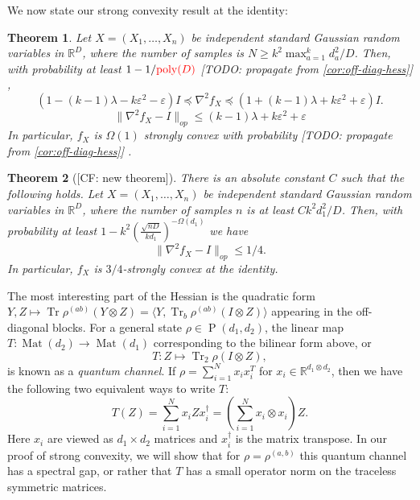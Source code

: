 \documentclass{article}
\newtheorem{theorem}{Theorem}
\DeclareMathOperator{\poly}{poly}
\DeclarePairedDelimiter{\norm}{\lVert}{\rVert}
\newcommand{\R}{{\mathbb{R}}}
\newcommand{\ot}{\otimes}
\newcommand{\mat}{\operatorname{Mat}}
\newcommand\eps{\varepsilon}
\newcommand\PD{\operatorname{P}}
\newcommand\samp{x}
\newcommand\rv{X}
\newcommand\tr{\operatorname{Tr}}
\newcommand{\CF}[1]{{\color{purple}[CF: #1]}}
\newcommand{\MW}[1]{{\color{red}[MW: #1]}}
\newcommand{\TODO}[1]{{\color{blue}[TODO: #1]}}
\begin{document}







We now state our strong convexity result at the identity:

\begin{theorem}\label{thm:tensor-convexity-old}
Let $\rv = (\rv_1,\dots,\rv_n)$ be independent standard Gaussian random variables in $\R^D$, where the number of samples is $N \geq k^2 \max_{a=1}^k d_a^2 / D$. Then, with probability at least $1 - 1/{\color{red}\poly(D)}$ \TODO{propagate from \cref{cor:off-diag-hess}} , 
$$ (1 - (k - 1) \lambda - k \eps^2 - \eps) I \preceq 
 \nabla^2 f_{\rv} \preceq (1 + (k - 1) \lambda + k \eps^2 + \eps) I.$$
$$ \|\nabla^{2} f_{\rv} - I\|_{op} \leq (k - 1) \lambda + k \eps^2 + \eps $$
 In particular, $f_{\rv}$ is $\Omega(1)$ strongly convex with probability \TODO{propagate from \cref{cor:off-diag-hess}} . 
\end{theorem}

\begin{theorem}[\CF{new theorem}]\label{thm:tensor-convexity} There is an absolute constant $C$ such that the following holds. Let $\rv = (\rv_1,\dots,\rv_n)$ be independent standard Gaussian random variables in $\R^D$, where the number of samples $n$ is at least $C k^2 d_1^2/D$. Then, with probability at least $1 - k^2 \left(\frac {\sqrt{nD}}{kd_1}\right)^{ - \Omega(d_1)}$ we have
$$ \|\nabla^{2} f_{\rv} - I\|_{op} \leq 1/4.$$
In particular, $f_{\rv}$ is $3/4$-strongly convex at the identity.
\end{theorem}



The most interesting part of the Hessian is the quadratic form $Y,Z \mapsto \tr \rho^{(ab)} \left( Y \ot Z \right) = \langle Y, \tr_b \rho^{(ab)} \left(I \ot Z\right) \rangle$ appearing in the off-diagonal blocks. For a general state $\rho \in \PD(d_1, d_2)$, the linear map $T:\mat(d_2) \to \mat(d_1)$ corresponding to the bilinear form above, or
$$T: Z \mapsto \tr_2 \rho \left(I \ot Z\right),$$
 is known as a \emph{quantum channel}. If $\rho = \sum_{i = 1}^N x_i x_i^T$ for $x_i \in \R^{d_1 \ot d_2}$, then we have the following two equivalent ways to write $T$:
$$ T(Z) = \sum_{i = 1}^N x_i Z x_i^\dagger = \left(\sum_{i = 1}^N x_i \ot x_i\right) Z.$$ 
Here $x_i$ are viewed as $d_1 \times d_2$ matrices and $x_i^\dagger$ is the matrix transpose. In our proof of strong convexity, we will show that for $\rho = \rho^{(a,b)}$ this quantum channel has a spectral gap, or rather that $T$ has a small operator norm on the traceless symmetric matrices. 
\end{document}
